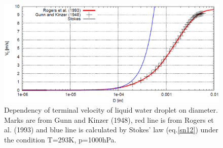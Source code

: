 \begin{table}[h]
\begin{center}
\caption{Branch points of the weighted terminal velocity.}
\label{table_sn14-2-10}
\end{center}
\end{table}

\begin{figure}[htbp]
\begin{center}
\includegraphics[scale=0.3]{./figure/D_vt_sn14.eps}
\end{center}
\caption{Dependency of terminal velocity of liquid water droplet on diameter. Marks are from Gunn and Kinzer (1948), red line is from Rogers et al. (1993) and blue line is calculated by Stokes’ law (eq.\ref{sn12}) under the condition T=293K, p=1000hPa.}
\label{figsn2-11}
\end{figure}

